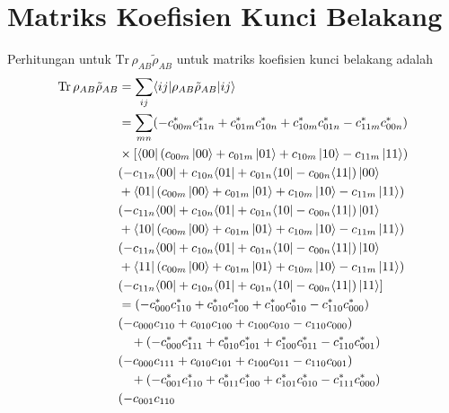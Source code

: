 \chapter{Matriks Koefisien Kunci Belakang}
Perhitungan untuk $\mathrm{Tr}\,\rho_{AB} \tilde{\rho}_{AB}$ untuk matriks koefisien kunci belakang adalah
\begin{equation}
	\begin{aligned}
		\mathrm{Tr}\,\rho_{AB} \tilde{\rho}_{AB}
		&= \sum_{i j}
		\langle i j |
		\rho_{AB} \tilde{\rho}_{AB}
		| i j \rangle \\
		&= \sum_{m n}
		(- c^{*}_{00m} c^{*}_{11n}
		+ c^{*}_{01m} c^{*}_{10n}
		+ c^{*}_{10m} c^{*}_{01n}
		- c^{*}_{11m} c^{*}_{00n})\\
		&\times[\bra{00}(c_{00m} \ket{00} + c_{01m} \ket{01} + c_{10m} \ket{10} - c_{11m} \ket{11})\\
		&(- c_{11n} \langle 00| + c_{10n} \langle 01| + c_{01n} \langle 10| - c_{00n} \langle 11|)\ket{00}\\
		&+\bra{01}(c_{00m} \ket{00} + c_{01m} \ket{01} + c_{10m} \ket{10} - c_{11m} \ket{11})\\
		&(- c_{11n} \langle 00| + c_{10n} \langle 01| + c_{01n} \langle 10| - c_{00n} \langle 11|)\ket{01}\\
		&+\bra{10}(c_{00m} \ket{00} + c_{01m} \ket{01} + c_{10m} \ket{10} - c_{11m} \ket{11})\\
		&(- c_{11n} \langle 00| + c_{10n} \langle 01| + c_{01n} \langle 10| - c_{00n} \langle 11|)\ket{10}\\
		&+\bra{11}(c_{00m} \ket{00} + c_{01m} \ket{01} + c_{10m} \ket{10} - c_{11m} \ket{11})\\
		&(- c_{11n} \langle 00| + c_{10n} \langle 01| + c_{01n} \langle 10| - c_{00n} \langle 11|)\ket{11}]\\
		&= (-c^{*}_{000} c^{*}_{110}
		+ c^{*}_{010} c^{*}_{100}
		+ c^{*}_{100} c^{*}_{010}
		- c^{*}_{110} c^{*}_{000})\\
		&(-c_{000} c_{110}
		+ c_{010} c_{100}
		+ c_{100} c_{010}
		- c_{110} c_{000}) \\
		&\quad + (-c^{*}_{000} c^{*}_{111}
		+ c^{*}_{010} c^{*}_{101}
		+ c^{*}_{100} c^{*}_{011}
		- c^{*}_{110} c^{*}_{001})\\
		&(-c_{000} c_{111}
		+ c_{010} c_{101}
		+ c_{100} c_{011}
		- c_{110} c_{001}) \\
		&\quad + (-c^{*}_{001} c^{*}_{110}
		+ c^{*}_{011} c^{*}_{100}
		+ c^{*}_{101} c^{*}_{010}
		- c^{*}_{111} c^{*}_{000})\\
		&(-c_{001} c_{110}

\end{aligned}
\end{equation}

